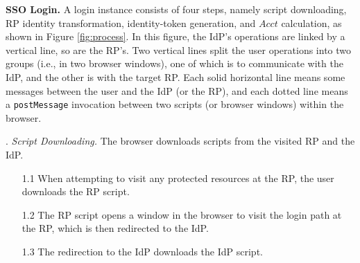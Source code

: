 \vspace{1mm}
\noindent\textbf{SSO Login.} A login instance %
consists of four steps, namely script downloading, RP identity transformation,
identity-token generation, and $Acct$ calculation, as shown in Figure \ref{fig:process}.
In this figure,
    the IdP's operations are linked by a vertical line,
        so are the RP's.
Two vertical lines split the user operations into two groups (i.e., in two browser windows),
    one of which is to communicate with the IdP,
                 and the other is with the target RP.
Each solid horizontal line means some messages between the user and the IdP (or the RP),
            and each dotted line means a \verb+postMessage+ invocation between two scripts (or browser windows) within the browser.



\vspace{0.5mm}
. {\em Script Downloading.}
The browser downloads scripts from the visited RP and the IdP.
\vspace{-\topsep}
\begin{itemize}
\setlength{\topsep}{0pt}
\setlength{\partopsep}{0pt}
\setlength{\itemsep}{0pt}
\setlength{\parsep}{0pt}
\setlength{\parskip}{0pt}
\item[1.1]
When attempting to visit any protected resources at the RP,
    the user downloads the RP script.
\item[1.2]
The RP script opens a window in the browser to visit the login path at the RP, which is then redirected to the IdP.
\item[1.3]
The redirection to the IdP downloads the IdP script.
\end{itemize}



